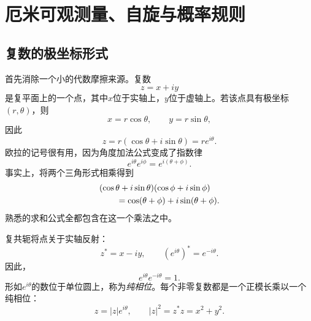 \chapter{厄米可观测量、自旋与概率规则}


\section{复数的极坐标形式}

首先消除一个小的代数摩擦来源。复数
\begin{equation}
  z=x+iy
\end{equation}
是复平面上的一个点，其中\(x\)位于实轴上，\(y\)位于虚轴上。若该点具有极坐标\((r,\theta)\)，则
\begin{equation}
  x=r\cos\theta,
  \qquad
  y=r\sin\theta,
\end{equation}
因此
\begin{equation}
  z=r(\cos\theta+i\sin\theta)=re^{i\theta}.
  \label{eq:l03-polar-form}
\end{equation}
欧拉的记号很有用，因为角度加法公式变成了指数律
\begin{equation}
  e^{i\theta}e^{i\phi}
  =e^{i(\theta+\phi)}.
  \label{eq:l03-phase-product}
\end{equation}
事实上，将两个三角形式相乘得到
\begin{align}
& (\cos\theta+i\sin\theta)(\cos\phi+i\sin\phi)
\notag\\
&\qquad=\cos(\theta+\phi)+i\sin(\theta+\phi).
\end{align}
熟悉的求和公式全都包含在这一个乘法之中。

复共轭将点关于实轴反射：
\begin{equation}
  z^*=x-iy,
  \qquad
  (e^{i\theta})^*=e^{-i\theta}.
\end{equation}
因此，
\begin{equation}
  e^{i\theta}e^{-i\theta}=1.
\end{equation}
形如\(e^{i\theta}\)的数位于单位圆上，称为\emph{纯相位}。每个非零复数都是一个正模长乘以一个纯相位：
\begin{equation}
  z=|z|e^{i\theta},
  \qquad
  |z|^2=z^*z=x^2+y^2.
  \label{eq:l03-modulus-phase}
\end{equation}

